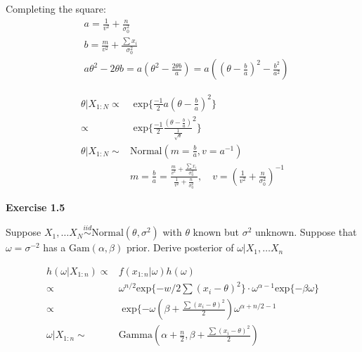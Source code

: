 \documentclass[12pt]{article}
\begin{document}
    \hline

    Completing the square:
    \begin{align*}
        &a =  \frac{1}{v^2} + \frac{n}{\sigma_0 ^2} \\
        &b =  \frac{m}{v^2} + \frac{\sum x_i}{\sigma_0 ^2} \\
        &a \theta ^2 - 2 \theta b = a ( \theta ^2 - \frac{2 \theta b}{a}) =
           a ( (\theta - \frac{b}{a})^2 - \frac{b^2}{a^2})
    \end{align*}
    \hline

    \begin{align*}
    \theta | X_{1:N} \propto& \text{ exp} \big \{ \frac{-1}{2} a (\theta - \frac{b}{a})^2 \big \} \\
        \propto&  \text{ exp} \big \{ \frac{-1}{2} \frac{(\theta - \frac{b}{a})}{\frac{1}{\sqrt{a}}}^2 \big \} \\
    \theta | X_{1:N} \sim& \text{Normal}(m = \frac{b}{a}, v = a^{-1}) \\
    &m = \frac{b}{a}  = \frac{\frac{m}{v^2} + \frac{\sum x_i}{\sigma_0 ^2}} {\frac{1}{v^2} + \frac{n}{\sigma_0 ^2} },
        \quad v = (\frac{1}{v^2} + \frac{n}{\sigma_0 ^2})^{-1}
    \end{align*}


    \noindent \textbf{Exercise 1.5}

    Suppose \(X_1, \dots X_N \stackrel{iid}{\sim} \text{Normal}(\theta, \sigma ^2) \) with \(\theta\) known
    but \(\sigma ^2\) unknown. Suppose that \(\omega = \sigma^{-2}\) has a \(\text{Gam}(\alpha, \beta)\) prior.
    Derive posterior of \(\omega | X_1, \dots X_n\)

    \begin{align*}
      h(\omega | X_{1:n}) \propto& f(x_{1:n}|\omega) h(\omega)\\
        \propto& \omega^{n/2} \text{exp} \{ -w/2 \sum (x_i - \theta)^2  \} \cdot \omega^{\alpha -1}
             \text{exp} \{ -\beta \omega \} \\
        \propto& \text{ exp} \{ -\omega ( \beta + \frac{\sum (x_i - \theta)^2}{2}) \omega^{\alpha + n/2 -1}\\
      \omega | X_{1:n} \sim& \text{Gamma}(\alpha + \frac{n}{2}, \beta + \frac{\sum (x_i - \theta)^2}{2})
    \end{align*}
\end{document}
